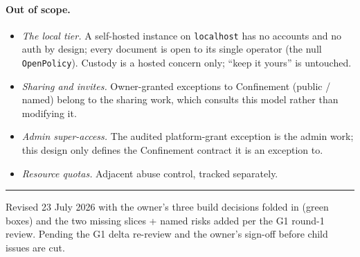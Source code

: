 \documentclass[11pt]{article}
\begin{document}
\paragraph{Out of scope.}
\begin{itemize}[leftmargin=1.6em]
  \item \emph{The local tier.} A self-hosted instance on \texttt{localhost} has no accounts and
  no auth by design; every document is open to its single operator (the null \texttt{OpenPolicy}).
  Custody is a hosted concern only; ``keep it yours'' is untouched.
  \item \emph{Sharing and invites.} Owner-granted exceptions to Confinement (public / named)
  belong to the sharing work, which consults this model rather than modifying it.
  \item \emph{Admin super-access.} The audited platform-grant exception is the admin work; this
  design only defines the Confinement contract it is an exception to.
  \item \emph{Resource quotas.} Adjacent abuse control, tracked separately.
\end{itemize}

\vspace{1em}
\hrule
\vspace{0.6em}
\noindent\small Revised 23 July 2026 with the owner's three build decisions folded in (green
boxes) and the two missing slices + named risks added per the G1 round-1 review. Pending the G1
delta re-review and the owner's sign-off before child issues are cut.
\end{document}
